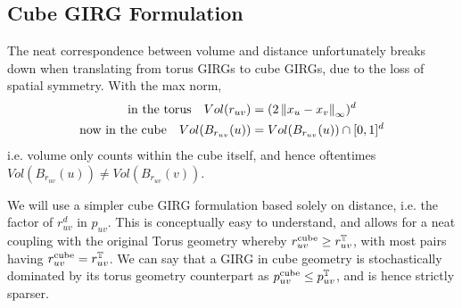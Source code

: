 \subsection{Cube GIRG Formulation}
The neat correspondence between volume and distance unfortunately breaks down when translating from torus GIRGs to cube GIRGs, due to the loss of spatial symmetry.
With the max norm,
\begin{align}
    \text{in the torus} \quad Vol(r_{uv}) &= (2 \left\lVert x_u - x_v\right\rVert_\infty)^d
\\
\text{now in the cube} \quad  Vol(B_{r_{uv}}(u)) &= Vol(B_{r_{uv}}(u)) \cap [0, 1]^d
\end{align}
i.e. volume only counts within the cube itself, and hence oftentimes $Vol(B_{r_{uv}}(u)) \neq Vol(B_{r_{uv}}(v))$. 

We will use a simpler cube GIRG formulation based solely on distance, i.e. the factor of $r_{uv}^d$ in $p_{uv}$. This is conceptually easy to understand, and allows for a neat coupling with the original Torus geometry whereby $r_{uv}^\text{cube} \geq r_{uv}^{\mathbb{T}}$, with most pairs having $r_{uv}^\text{cube} = r_{uv}^{\mathbb{T}}$. We can say that a GIRG in cube geometry is stochastically dominated by its torus geometry counterpart as $p_{uv}^\text{cube} \leq p_{uv}^{\mathbb{T}}$, and is hence strictly sparser.

